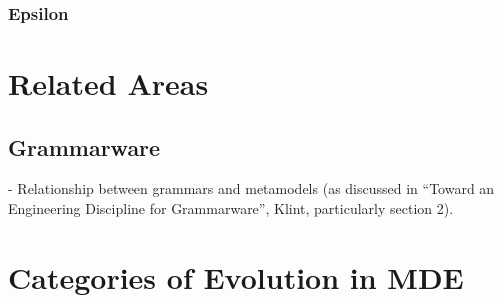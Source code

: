 \subsubsection{Epsilon}
\label{subsubsec:epsilon}



\section{Related Areas}

\subsection{Grammarware}
\label{subsec:grammarware}
- Relationship between grammars and metamodels (as discussed in ``Toward an Engineering Discipline for Grammarware'', Klint, particularly section 2).

\section{Categories of Evolution in MDE}
